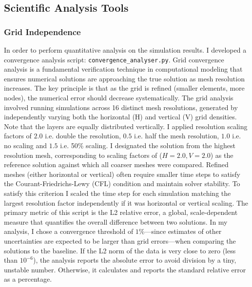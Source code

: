\subsection{Scientific Analysis Tools} 
\subsubsection{Grid Independence}\label{grid_ind}
In order to  perform quantitative analysis on the simulation results. I developed a convergence analysis script: \texttt{convergence\_analyser.py}.
Grid convergence analysis is a fundamental verification technique in computational modeling that ensures numerical solutions are approaching the true solution as mesh resolution increases. The key principle is that as the grid is refined (smaller elements, more nodes), the numerical error should decrease systematically.
The grid analysis involved running simulations across 16 distinct mesh resolutions, generated by independently varying both the horizontal (H) and vertical (V) grid densities. Note that the layers are equally distributed vertically. I applied resolution scaling factors of $2.0$ i.e. double the resolution, $0.5$ i.e. half the mesh resolution, $1.0$ i.e. no scaling and $1.5$ i.e. 50\% scaling. I designated the solution from the highest resolution mesh, corresponding to scaling factors of ($H=2.0, V=2.0$) as the reference solution against which all coarser meshes were compared. Refined meshes (either horizontal or vertical) often require smaller time steps to satisfy the Courant-Friedrichs-Lewy (CFL) condition and maintain solver stability. To satisfy this criterion I scaled the time step for each simulation matching the largest resolution factor independently if it was horizontal or vertical scaling.
The primary metric of this script is the L2 relative error, a global, scale-dependent measure that quantifies the overall difference between two solutions. In my analysis, I chose a convergence threshold of $1\%$—since estimates of other uncertainties are expected to be larger than grid errors—when comparing the solutions to the baseline. If the L2 norm of the data is very close to zero (less than $10^{-6}$), the analysis reports the absolute error to avoid division by a tiny, unstable number. Otherwise, it calculates and reports the standard relative error as a percentage.

